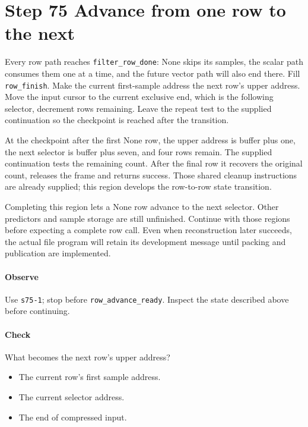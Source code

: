 \section{Step 75 Advance from one row to the next}
Every row path reaches \texttt{filter\_row\_done}: None skips its samples, the scalar path consumes them one at a time, and the future vector path will also end there. Fill \texttt{row\_finish}. Make the current first-sample address the next row’s upper address. Move the input cursor to the current exclusive end, which is the following selector, decrement rows remaining. Leave the repeat test to the supplied continuation so the checkpoint is reached after the transition.

At the checkpoint after the first None row, the upper address is buffer plus one, the next selector is buffer plus seven, and four rows remain. The supplied continuation tests the remaining count. After the final row it recovers the original count, releases the frame and returns success. Those shared cleanup instructions are already supplied; this region develops the row-to-row state transition.

Completing this region lets a None row advance to the next selector. Other predictors and sample storage are still unfinished. Continue with those regions before expecting a complete row call. Even when reconstruction later succeeds, the actual file program will retain its development message until packing and publication are implemented.

\paragraph{Observe} Use \texttt{s75-1}; stop before \texttt{row\_advance\_ready}. Inspect the state described above before continuing.

\paragraph{Check} What becomes the next row’s upper address?
\begin{itemize}
\item[A.] The current row’s first sample address.
\item[B.] The current selector address.
\item[C.] The end of compressed input.
\end{itemize}
